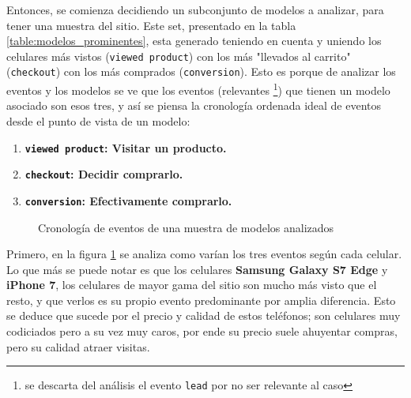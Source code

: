 \documentclass[a4paper]{article}
\begin{document}
Entonces, se comienza decidiendo un subconjunto de modelos a analizar, para tener una muestra del sitio. Este set, presentado en la tabla \ref{table:modelos_prominentes}, esta generado teniendo en cuenta y uniendo los celulares más vistos (\texttt{viewed product}) con los más "llevados al carrito" (\texttt{checkout}) con los más comprados (\texttt{conversion}). Esto es porque de analizar los eventos y los modelos se ve que los eventos (relevantes \footnote{se descarta del análisis el evento \texttt{lead} por no ser relevante al caso}) que tienen un modelo asociado son esos tres, y así se piensa la cronología ordenada ideal de eventos desde el punto de vista de un modelo:

\begin{enumerate}
\item \textbf{\texttt{viewed product}: Visitar un producto.}
\item \textbf{\texttt{checkout}: Decidir comprarlo.}
\item \textbf{\texttt{conversion}: Efectivamente comprarlo.}
\end{enumerate}

\begin{figure}[h!]
	\caption{Cronología de eventos de una muestra de modelos analizados}
	\label{fig:prominentes}
\end{figure}

Primero, en la figura \ref{fig:prominentes} se analiza como varían los tres eventos según cada celular. Lo que más se puede notar es que los celulares \textbf{Samsung Galaxy S7 Edge} y \textbf{iPhone 7}, los celulares de mayor gama del sitio son mucho más visto que el resto, y que verlos es su propio evento predominante por amplia diferencia. Esto se deduce que sucede por el precio y calidad de estos teléfonos; son celulares muy codiciados pero a su vez muy caros, por ende su precio suele ahuyentar compras, pero su calidad atraer visitas.
\end{document}
